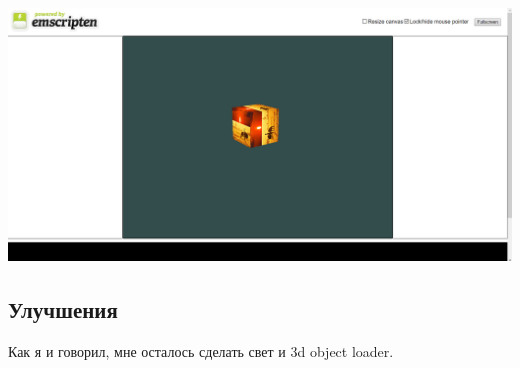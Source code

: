 \documentclass[12pt]{article}
\begin{document}
  \includegraphics[width=\linewidth]{images/web_res.png}
  \subsection{Улучшения}
  Как я и говорил, мне осталось сделать свет и 3d object loader.
\end{document}
